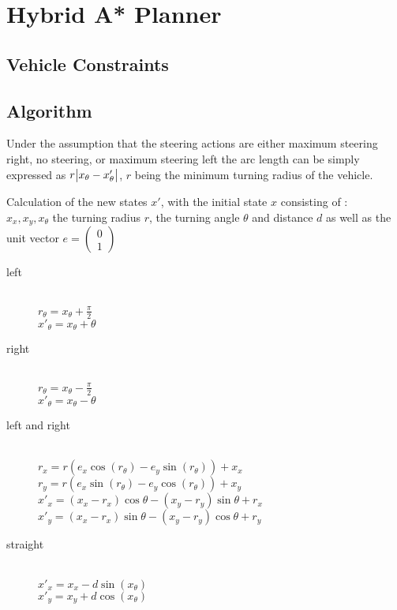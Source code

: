 \chapter{Hybrid A* Planner}

\section{Vehicle Constraints}

\section{Algorithm}

Under the assumption that the steering actions are either maximum steering right, no steering, or maximum steering left the arc length can be simply expressed as $r\abs{x_\theta- x'_\theta}$, $r$ being the minimum turning radius of the vehicle. 

Calculation of the new states $x'$, with the initial state $x$ consisting of :\\
$x_x, x_y, x_\theta$ the turning radius $r$, the turning angle $\theta$ and distance $d$ as well as the unit vector $e = \left(\begin{smallmatrix}0\\1\end{smallmatrix}\right)$
\begin{description}
  \item[left] \hfill \\
  $r_\theta = x_\theta + \frac{\pi}{2}$\\
  $x'_\theta = x_\theta + \theta$
  \item[right] \hfill \\
  $r_\theta = x_\theta - \frac{\pi}{2}$\\
  $x'_\theta = x_\theta - \theta$
  \item[left and right] \hfill\\
  $r_x = r(e_x\cos(r_\theta) - e_y\sin(r_\theta)) + x_x$\\
  $r_y = r(e_x\sin(r_\theta) - e_y\cos(r_\theta)) + x_y$\\
  $x'_x = (x_x-r_x)\cos\theta - (x_y-r_y)\sin\theta + r_x$\\
  $x'_y = (x_x-r_x)\sin\theta - (x_y-r_y)\cos\theta + r_y$
  \item[straight] \hfill \\
  $x'_x = x_x - d\sin(x_\theta)$\\
  $x'_y = x_y + d\cos(x_\theta)$
\end{description}

